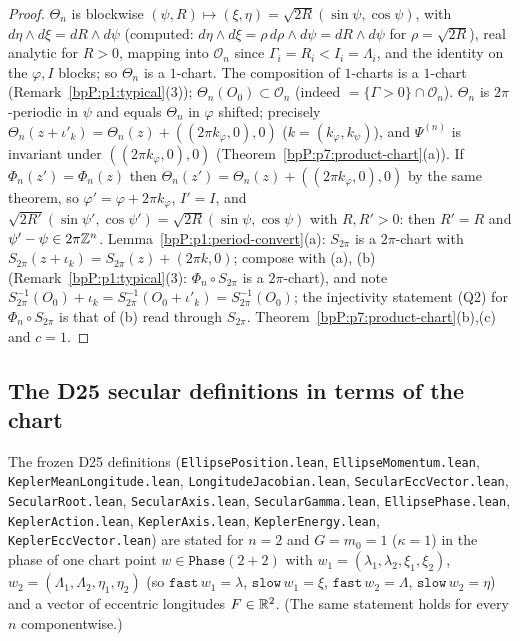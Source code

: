 \begin{proof}
\label{stepP:p7:la-polar} $\Theta_n$ is blockwise $(\psi,R)\mapsto(\xi,\eta)=\sqrt{2R}(\sin\psi,\cos\psi)$, with $d\eta\wedge d\xi=dR\wedge d\psi$ (computed: $d\eta\wedge d\xi=\rho\,d\rho\wedge d\psi=dR\wedge d\psi$ for $\rho=\sqrt{2R}$), real analytic for $R>0$, mapping into $\mathcal O_n$ since $\Gamma_i=R_i<I_i=\Lambda_i$, and the identity on the $\varphi,I$ blocks; so $\Theta_n$ is a $1$-chart. The composition of $1$-charts is a $1$-chart (Remark~\ref{bpP:p1:typical}(3)); $\Theta_n(O_0)\subset\mathcal O_n$ (indeed $=\{\Gamma>0\}\cap\mathcal O_n$).
\label{stepP:p7:la-inv} $\Theta_n$ is $2\pi$-periodic in $\psi$ and equals $\Theta_n$ in $\varphi$ shifted; precisely $\Theta_n(z+\iota'_k)=\Theta_n(z)+((2\pi k_\varphi,0),0)$ ($k=(k_\varphi,k_\psi)$), and $\Psi^{(n)}$ is invariant under $((2\pi k_\varphi,0),0)$ (Theorem~\ref{bpP:p7:product-chart}(a)). If $\Phi_n(z')=\Phi_n(z)$ then $\Theta_n(z')=\Theta_n(z)+((2\pi k_\varphi,0),0)$ by the same theorem, so $\varphi'=\varphi+2\pi k_\varphi$, $I'=I$, and $\sqrt{2R'}(\sin\psi',\cos\psi')=\sqrt{2R}(\sin\psi,\cos\psi)$ with $R,R'>0$: then $R'=R$ and $\psi'-\psi\in2\pi\mathbb{Z}^n$.
\label{stepP:p7:la-per} Lemma~\ref{bpP:p1:period-convert}(a): $S_{2\pi}$ is a $2\pi$-chart with $S_{2\pi}(z+\iota_k)=S_{2\pi}(z)+(2\pi k,0)$; compose with (a), (b) (Remark~\ref{bpP:p1:typical}(3): $\Phi_n\circ S_{2\pi}$ is a $2\pi$-chart), and note $S_{2\pi}^{-1}(O_0)+\iota_k=S_{2\pi}^{-1}(O_0+\iota'_k)=S_{2\pi}^{-1}(O_0)$; the injectivity statement (Q2) for $\Phi_n\circ S_{2\pi}$ is that of (b) read through $S_{2\pi}$.
\label{stepP:p7:la-ham} Theorem~\ref{bpP:p7:product-chart}(b),(c) and $c=1$.
\end{proof}

\subsection{The D25 secular definitions in terms of the chart}\label{bpP:p7:sec-d25}

The frozen D25 definitions (\texttt{EllipsePosition.lean}, \texttt{EllipseMomentum.lean}, \texttt{KeplerMeanLongitude.lean}, \texttt{LongitudeJacobian.lean}, \texttt{SecularEccVector.lean}, \texttt{SecularRoot.lean}, \texttt{SecularAxis.lean}, \texttt{SecularGamma.lean}, \texttt{EllipsePhase.lean}, \texttt{KeplerAction.lean}, \texttt{KeplerAxis.lean}, \texttt{KeplerEnergy.lean}, \texttt{KeplerEccVector.lean}) are stated for $n=2$ and $G=m_0=1$ ($\kappa=1$) in the phase of one chart point $w\in\texttt{Phase}(2+2)$ with
$w_1=(\lambda_1,\lambda_2,\xi_1,\xi_2)$, $w_2=(\Lambda_1,\Lambda_2,\eta_1,\eta_2)$ (so $\texttt{fast}\,w_1=\lambda$, $\texttt{slow}\,w_1=\xi$, $\texttt{fast}\,w_2=\Lambda$, $\texttt{slow}\,w_2=\eta$) and a vector of eccentric longitudes $F\in\mathbb{R}^2$.
(The same statement holds for every $n$ componentwise.)

